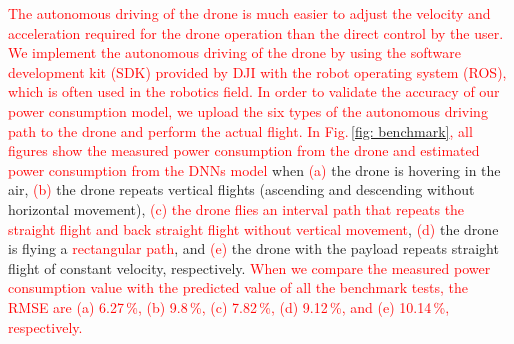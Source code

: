 \documentclass[journal]{./template/IEEEtran}
\begin{document}
\textcolor{red}{The autonomous driving of the drone is much easier to adjust the velocity and acceleration required for the drone operation than the direct control by the user.
We implement the autonomous driving of the drone by using the software development kit (SDK) provided by DJI with the robot operating system (ROS), which is often used in the robotics field. 
In order to validate the accuracy of our power consumption model, we upload the six types of the autonomous driving path to the drone and perform the actual flight.}
\textcolor{red}{In Fig.\,\ref{fig: benchmark}, all figures show the measured power consumption from the drone and estimated power consumption from the DNNs model} when \textcolor{red}{(a)} the drone is hovering in the air, \textcolor{red}{(b)} the drone repeats vertical flights (ascending and descending without horizontal movement), \textcolor{red}{(c) the drone flies an interval path that repeats the straight flight and back straight flight without vertical movement}, \textcolor{red}{(d)} the drone is flying a \textcolor{red}{rectangular path}, and \textcolor{red}{(e)} the drone with the payload repeats straight flight of constant velocity, respectively. 
\textcolor{red}{When we compare the measured power consumption value with the predicted value of all the benchmark tests, the RMSE are (a) 6.27\,\%, (b) 9.8\,\%, (c) 7.82\,\%, (d) 9.12\,\%, and (e) 10.14\,\%, respectively.}
\end{document}
